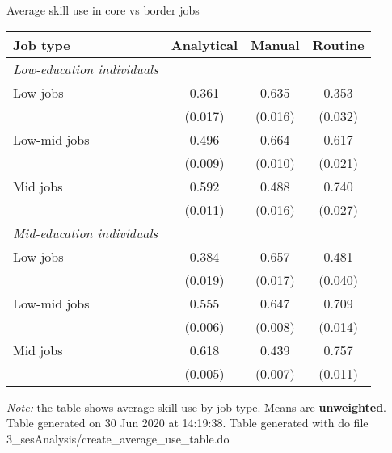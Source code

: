\begin{center}
\begin{threeparttable}[!h]
\caption{Average skill use in core vs border jobs}
\begin{tabular}{lccc}
\toprule
\toprule
\textbf{Job type}&\multicolumn{1}{c}{\textbf{Analytical}}&\multicolumn{1}{c}{\textbf{Manual}}&\multicolumn{1}{c}{\textbf{Routine}} \\
\midrule
\textit{Low-education individuals} \\  \midrule
\hspace{3mm}Low jobs&       0.361&       0.635&       0.353\\
                    &     (0.017)&     (0.016)&     (0.032)\\
\hspace{3mm}Low-mid jobs&       0.496&       0.664&       0.617\\
                    &     (0.009)&     (0.010)&     (0.021)\\
\hspace{3mm}Mid jobs&       0.592&       0.488&       0.740\\
                    &     (0.011)&     (0.016)&     (0.027)\\
\textit{Mid-education individuals} \\  \midrule
\hspace{3mm}Low jobs&       0.384&       0.657&       0.481\\
                    &     (0.019)&     (0.017)&     (0.040)\\
\hspace{3mm}Low-mid jobs&       0.555&       0.647&       0.709\\
                    &     (0.006)&     (0.008)&     (0.014)\\
\hspace{3mm}Mid jobs&       0.618&       0.439&       0.757\\
                    &     (0.005)&     (0.007)&     (0.011)\\
\bottomrule
\bottomrule
\end{tabular}
\begin{tablenotes}
\item \footnotesize \textit{Note:} the table shows average skill use by job type. Means are \textbf{unweighted}. Table generated on 30 Jun 2020 at 14:19:38. Table generated with do file 3\_sesAnalysis/create\_average\_use\_table.do
\end{tablenotes}
\end{threeparttable}
\end{center}
